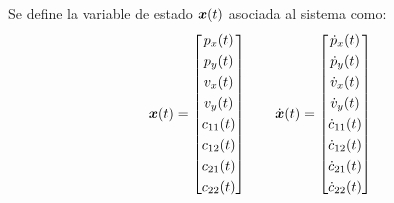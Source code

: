 	
	Se define la variable de estado $\boldsymbol{x}(t)$ asociada al sistema como:
		\begin{equation*}
			\vect{x}(t) = \begin{bmatrix} {p_x}(t) \\[0.3em] p_y(t) \\[0.3em] {v_x}(t) \\[0.3em] v_y(t) \\[0.3em] c_{11}(t) \\[0.3em] c_{12}(t) \\[0.3em] c_{21}(t) \\[0.3em] c_{22}(t) \end{bmatrix} \qquad%
			\dot{\vect{x}}(t) = \begin{bmatrix} {\dot{p}_x}(t) \\[0.3em] \dot{p}_y(t) \\[0.3em] {\dot{v}_x}(t) \\[0.3em] \dot{v}_y(t) \\[0.3em] \dot{c}_{11}(t) \\[0.3em] \dot{c}_{12}(t) \\[0.3em] \dot{c}_{21}(t) \\[0.3em] \dot{c}_{22}(t) \end{bmatrix}
		\end{equation*}

